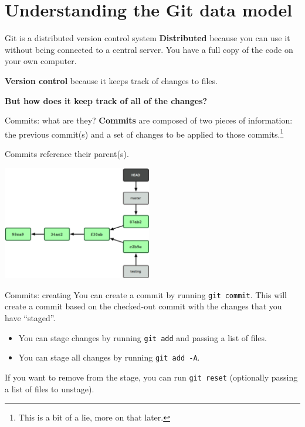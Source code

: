 \documentclass{beeper}
\begin{document}
\section{Understanding the Git data model}

\begin{frame}{Git is a distributed version control system}
    \textbf{Distributed} because you can use it without being connected to a
    central server. You have a full copy of the code on your own computer.

    \textbf{Version control} because it keeps track of changes to files.

    \pause

    \textbf{But how does it keep track of all of the changes?}
\end{frame}

\begin{frame}{Commits: what are they?}
    \textbf{Commits} are composed of two pieces of information: the previous
    commit(s) and a set of changes to be applied to those commits.\footnote[frame]{
        This is a bit of a lie, more on that later.}

    Commits reference their parent(s).

    \begin{center}
        \includegraphics[width=65mm]{graphics/branching5.png}
    \end{center}
\end{frame}

\begin{frame}{Commits: creating}
    You can create a commit by running \texttt{git commit}. This will create a
    commit based on the checked-out commit with the changes that you have
    ``staged''.
    \pause

    \begin{itemize}[<+->]
        \item You can stage changes by running \texttt{git add} and passing a
            list of files.
        \item You can stage all changes by running \texttt{git add -A}.
    \end{itemize}

    \pause[\thebeamerpauses]
    If you want to remove from the stage, you can run \texttt{git reset}
    (optionally passing a list of files to unstage).
\end{frame}
\end{document}
